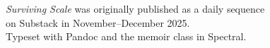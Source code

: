 \cleardoublepage
\thispagestyle{empty}
\vspace*{\fill}
\begin{center}
\textit{Surviving Scale} was originally published as a daily sequence\\
on Substack in November--December 2025.\\[1.5em]
\small Typeset with Pandoc and the memoir class in Spectral.
\end{center}
\vspace*{\fill}
